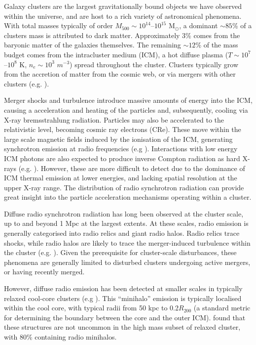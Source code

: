 \documentclass{pas}
\newcommand{\Msun}{M$_\odot$}
\begin{document}
Galaxy clusters are the largest gravitationally bound objects we have observed within the universe, and are host to a rich variety of astronomical phenomena. With total masses typically of order $M_{500}\sim10^{14}$--$10^{15}$ \Msun{}, a dominant $\sim85$\% of a clusters mass is attributed to dark matter. Approximately 3\% comes from the baryonic matter of the galaxies themselves. The remaining $\sim12$\% of the mass budget comes from the intracluster medium (ICM), a hot diffuse plasma ($T\sim10^7$--$10^8$ K, $n_e\sim10^{3}$ $m^{-3}$) spread throughout the cluster. Clusters typically grow from the accretion of matter from the cosmic web, or via mergers with other clusters (e.g. \citealt{2012ARA&A..50..353K}). 

Merger shocks and turbulence introduce massive amounts of energy into the ICM, causing a acceleration and heating of the particles and, subsequently, cooling via X-ray bremsstrahlung radiation. Particles may also be accelerated to the relativistic level, becoming cosmic ray electrons (CRe). These move within the large scale magnetic fields induced by the ionisation of the ICM, generating synchrotron emission at radio frequencies (e.g \citealt{2012A&ARv..20...54F}). Interactions with low energy ICM photons are also expected to produce inverse Compton radiation as hard X-rays (e.g. \citealt{2004IJMPD..13.1549G}). However, these are more difficult to detect due to the dominance of ICM thermal emission at lower energies, and lacking spatial resolution at the upper X-ray range. The distribution of radio synchrotron radiation can provide great insight into the particle acceleration mechanisms operating within a cluster. 

Diffuse radio synchrotron radiation has long been observed at the cluster scale, up to and beyond 1 Mpc at the largest extents. At these scales, radio emission is generally categorised into radio relics and giant radio halos. Radio relics trace shocks, while radio halos are likely to trace the merger-induced turbulence within the cluster (e.g. \citealt{2014IJMPD..2330007B}). Given the prerequisite for cluster-scale disturbances, these phenomena are generally limited to disturbed clusters undergoing active mergers, or having recently merged. 

However, diffuse radio emission has been detected at smaller scales in typically relaxed cool-core clusters (e.g \citealt{2014ApJ...781....9G}). This ``minihalo'' emission is typically localised within the cool core, with typical radii from 50 kpc to 0.2$R_{200}$ (a standard metric for determining the boundary between the core and the outer ICM). \citet{2017ApJ...841...71G} found that these structures are not uncommon in the high mass subset of relaxed cluster, with 80\% containing radio minihalos. 
\end{document}
